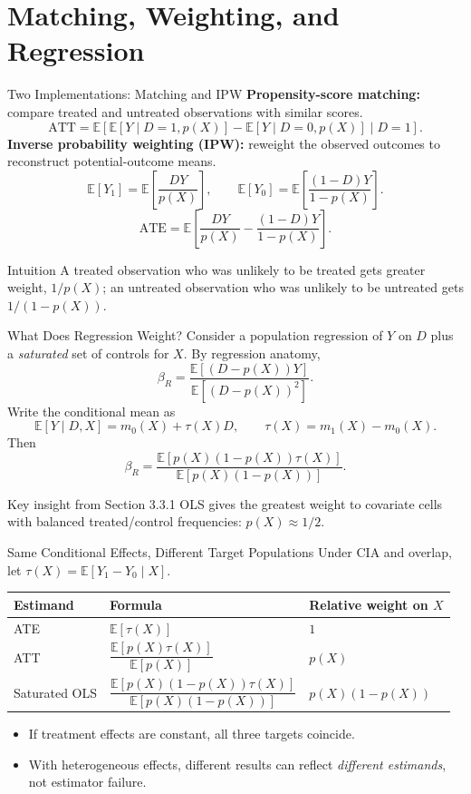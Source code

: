 \documentclass[aspectratio=169,11pt]{beamer}
\newcommand{\E}{\mathbb{E}}
\newcommand{\ATE}{\mathrm{ATE}}
\newcommand{\ATT}{\mathrm{ATT}}
\begin{document}
\section{Matching, Weighting, and Regression}
\begin{frame}{Two Implementations: Matching and IPW}
\small
\textbf{Propensity-score matching:} compare treated and untreated observations with similar scores.
\[
\ATT=\E\!\left[\E[Y\mid D=1,p(X)]-\E[Y\mid D=0,p(X)]\mid D=1\right].
\]
\medskip
\textbf{Inverse probability weighting (IPW):} reweight the observed outcomes to reconstruct potential-outcome means.
\[
\E[Y_1]=\E\left[\frac{DY}{p(X)}\right],\qquad
\E[Y_0]=\E\left[\frac{(1-D)Y}{1-p(X)}\right].
\]
\[
\boxed{\ATE=\E\left[\frac{DY}{p(X)}-\frac{(1-D)Y}{1-p(X)}\right].}
\]
\begin{block}{Intuition}
A treated observation who was unlikely to be treated gets greater weight, \(1/p(X)\); an untreated observation who was unlikely to be untreated gets \(1/(1-p(X))\).
\end{block}
\end{frame}

\begin{frame}{What Does Regression Weight?}
\small
Consider a population regression of \(Y\) on \(D\) plus a \emph{saturated} set of controls for \(X\). By regression anatomy,
\[
\beta_R=\frac{\E[(D-p(X))Y]}{\E[(D-p(X))^2]}.
\]
Write the conditional mean as
\[
\E[Y\mid D,X]=m_0(X)+\tau(X)D,\qquad \tau(X)=m_1(X)-m_0(X).
\]
Then
\[
\boxed{\beta_R=\frac{\E[p(X)(1-p(X))\tau(X)]}{\E[p(X)(1-p(X))]}.}
\]
\begin{block}{Key insight from Section 3.3.1}
OLS gives the greatest weight to covariate cells with balanced treated/control frequencies: \(p(X)\approx 1/2\).
\end{block}
\end{frame}

\begin{frame}{Same Conditional Effects, Different Target Populations}
\small
Under CIA and overlap, let \(\tau(X)=\E[Y_1-Y_0\mid X]\).
\medskip
\begin{center}
\begin{tabular}{lll}
\toprule
\textbf{Estimand} & \textbf{Formula} & \textbf{Relative weight on }\(X\)\\
\midrule
ATE & \(\E[\tau(X)]\) & \(1\)\\[0.4em]
ATT & \(\dfrac{\E[p(X)\tau(X)]}{\E[p(X)]}\) & \(p(X)\)\\[0.6em]
Saturated OLS & \(\dfrac{\E[p(X)(1-p(X))\tau(X)]}{\E[p(X)(1-p(X))]}\) & \(p(X)(1-p(X))\)\\
\bottomrule
\end{tabular}
\end{center}
\medskip
\begin{itemize}
\item If treatment effects are constant, all three targets coincide.
\item With heterogeneous effects, different results can reflect \emph{different estimands}, not estimator failure.
\end{itemize}
\end{frame}
\end{document}
